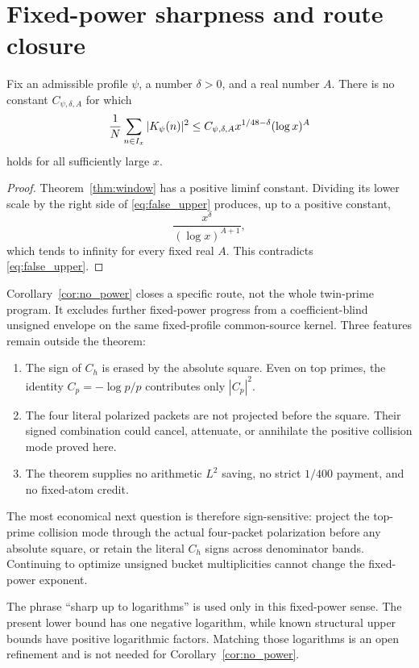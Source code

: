 \section{Fixed-power sharpness and route closure}\label{sec:sharpness}

\begin{corollary}\label{cor:no_power}
Fix an admissible profile $\psi$, a number $\delta>0$, and a real number $A$.
There is no constant $C_{\psi,\delta,A}$ for which
\begin{equation}\label{eq:false_upper}
 \frac{1}{N}\sum_{n\in I_x} |K_\psi(n)|^2
 \leq C_{\psi,\delta,A}
 x^{1/48-\delta}(\log x)^A
\end{equation}
holds for all sufficiently large $x$.
\end{corollary}

\begin{proof}
Theorem~\ref{thm:window} has a positive liminf constant.  Dividing its lower
scale by the right side of \eqref{eq:false_upper} produces, up to a positive
constant,
\[
 \frac{x^\delta}{(\log x)^{A+1}},
\]
which tends to infinity for every fixed real $A$.  This contradicts
\eqref{eq:false_upper}.
\end{proof}

Corollary~\ref{cor:no_power} closes a specific route, not the whole twin-prime
program.  It excludes further fixed-power progress from a coefficient-blind
unsigned envelope on the same fixed-profile common-source kernel.  Three
features remain outside the theorem:

\begin{enumerate}
\item The sign of $C_h$ is erased by the absolute square.  Even on top primes,
      the identity $C_p=-\log p/p$ contributes only $|C_p|^2$.
\item The four literal polarized packets are not projected before the square.
      Their signed combination could cancel, attenuate, or annihilate the
      positive collision mode proved here.
\item The theorem supplies no arithmetic $L^2$ saving, no strict $1/400$
      payment, and no fixed-atom credit.
\end{enumerate}

The most economical next question is therefore sign-sensitive: project the
top-prime collision mode through the actual four-packet polarization before any
absolute square, or retain the literal $C_h$ signs across denominator bands.
Continuing to optimize unsigned bucket multiplicities cannot change the
fixed-power exponent.

The phrase ``sharp up to logarithms'' is used only in this fixed-power sense.
The present lower bound has one negative logarithm, while known structural
upper bounds have positive logarithmic factors.  Matching those logarithms is
an open refinement and is not needed for Corollary~\ref{cor:no_power}.
